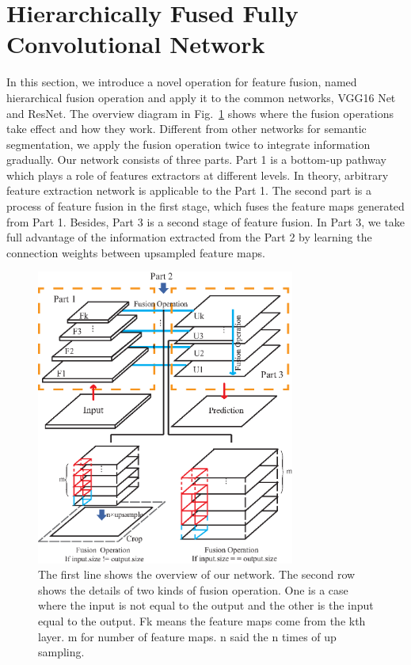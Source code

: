 \section{Hierarchically Fused Fully Convolutional Network}
\label{Sec:HF-FCN}
In this section, we introduce a novel operation for feature fusion, named hierarchical fusion operation and apply it to the common networks, VGG16 Net and ResNet. The overview diagram in Fig.~\ref{fig:Fusion-Operation} shows where the fusion operations take effect and how they work. Different from other networks for semantic segmentation, we apply the fusion operation twice to integrate information gradually.
Our network consists of three parts. Part 1 is a bottom-up pathway which plays a role of features extractors at different levels.
In theory, arbitrary feature extraction network is applicable to the Part 1.
The second part is a process of feature fusion in the first stage, which fuses the feature maps generated from Part 1.
Besides, Part 3 is a second stage of feature fusion.
In Part 3, we take full advantage of the information extracted from the Part 2 by learning the connection weights between upsampled feature maps.

\begin{figure}
\vspace{-0.4cm}
\setlength{\abovecaptionskip}{-0cm}
\setlength{\belowcaptionskip}{-2cm} 
\centering
\includegraphics[width=8.5cm]{Figures/Fusion_Operation.eps}
\caption{The first line shows the overview of our network. The second row shows the details of two kinds of fusion operation. One is a case where the input is not equal to the output and the other is the input equal to the output. Fk means the feature maps come from the kth layer. m for number of feature maps. n said the n times of up sampling.}
\label{fig:Fusion-Operation}
\end{figure}
